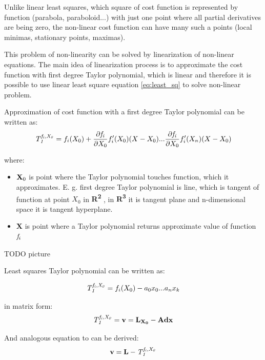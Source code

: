 \documentclass[a4paper,12pt]{report}
\newcommand{\ematr}[1]{
{\bf #1}
}
\newcommand{\evect}[1]{
{\bf #1}
}
\newcommand{\eucl}[1]{
{\bf R\textsuperscript{#1}}
}
\newcommand{\efunc}[1]{
{\it #1}
}
\begin{document}
Unlike linear least squares, which square of cost function is represented by function  (parabola, paraboloid...) with just one point where all
partial derivatives are being zero, the non-linear cost function can have many such a points (local minimas, stationary points, maximas). 

This problem of non-linearity can be solved by linearization of non-linear equations.
The main idea of linearization process is to approximate the cost function with first degree Taylor polynomial,
which is linear and therefore it is possible to use linear least square equation \eqref{eq:least_sq} 
to solve non-linear problem. 

Approximation of cost function with a first degree Taylor polynomial can be written as:
\begin{equation}
\efunc{T^{f_{i}, X_{0}}_{1}} = f_{i}(X_{0}) + \frac{\partial \efunc{f_{i}}}{\partial {X_{0}}} f_{i}'(X_{0}) (X -  X_{0}) 
... \frac{\partial \efunc{f_{i}}}{\partial {X_{0}}} f_{i}'(X_{n}) (X -  X_{0}) 
\end{equation}

where:
\begin{itemize}
\item $\evect{X}_{0}$ is point where the Taylor polynomial touches function, which it approximates. E. g. first degree Taylor polynomial 
      is line, which is tangent of function at point $X_{0}$ in \eucl{2}, in \eucl{3} it is tangent plane and n-dimensional 
      space it is tangent hyperplane.
\item \evect{X} is point where a Taylor polynomial returns approximate value of function $\efunc{f}_{i}$
\end{itemize}

TODO picture 

Least squares Taylor polynomial can be written as:

\begin{equation}
\efunc{T^{f_{i}, X_{0}}_{1}} = f_{i}(X_{0}) - a_{0} x_{0} ... a_{n} x_{k} 
\end{equation} 

in matrix form:
\begin{equation}
\efunc{T^{f_{i}, X_{0}}_{1}} = \evect{v} = \evect{L_{X_{0}}} - \ematr{A}\evect{dx}
\end{equation} 

And analogous equation to \label{eq:least_v} can be derived:
\begin{equation}
\evect{v} = \evect{L} - \efunc{T^{f_{i}, X_{0}}_{1}}
\end{equation} 
 
\end{document}
